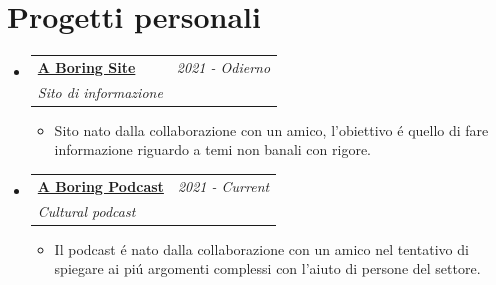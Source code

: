 \documentclass[a4paper,11pt]{article}
\makeatletter
\newcommand{\resumePOR}[3]{
\vspace{0.5mm}\item
    \begin{tabular*}{0.97\textwidth}[t]{l@{\extracolsep{\fill}}r}
        \textbf{#1},\hspace{0.3mm}#2 & \textit{\small{#3}} 
    \end{tabular*}
    \vspace{-2mm}
}
\newcommand{\resumeProject}[4]{
\vspace{0.5mm}\item
    \begin{tabular*}{0.98\textwidth}[t]{l@{\extracolsep{\fill}}r}
        \textbf{#1} & \textit{\footnotesize{#3}} \\
        \footnotesize{\textit{#2}} & \footnotesize{#4}
    \end{tabular*}
    \vspace{-2.4mm}
}
\newcommand{\resumeSubHeadingListStart}{\begin{itemize}[leftmargin=*,labelsep=0mm]}
\newcommand{\resumeItemListStart}{\begin{justify}\begin{itemize}[leftmargin=3ex, rightmargin=2ex, 
  noitemsep,labelsep=1.2mm,itemsep=0mm]\small}
\newcommand{\resumeSubHeadingListEnd}{\end{itemize}\vspace{2mm}}
\newcommand{\resumeItemListEnd}{\end{itemize}\end{justify}\vspace{-2mm}}
\makeatother
\begin{document}


\section{\textbf{Progetti personali}}
\vspace{-0.1mm}
\resumeSubHeadingListStart
\resumeProject
  {\href{https://www.aboringsite.com/}{\textbf{A Boring Site}}} %
  {Sito di informazione} %
  {2021 - Odierno} %
  {
  } %
  \resumeItemListStart
  \item {Sito nato dalla collaborazione con un amico, l'obiettivo é quello di fare informazione riguardo a 
  temi non banali con rigore.}
  \resumeItemListEnd

\resumeProject
  {\href{https://open.spotify.com/show/5mKtG1VeiAUcUcDIqKHrYL?si=a00a07d9f7574171}
  {\textbf{A Boring Podcast}}} %
  {Cultural podcast} %
  {2021 - Current} %
  {
  } %
  \resumeItemListStart
  \item {Il podcast é nato dalla collaborazione con un amico nel tentativo di spiegare ai piú argomenti 
  complessi con l'aiuto di persone del settore.}
  \resumeItemListEnd

\resumeSubHeadingListEnd
\vfill
\end{document}
